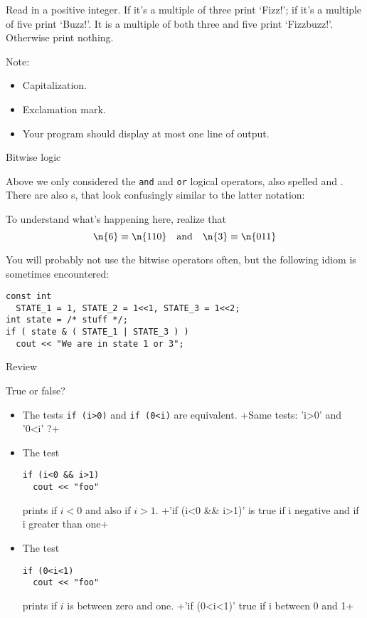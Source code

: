 \begin{exercise}
  \label{ex:fizzbuzz}
  Read in a positive integer. If it's a multiple of three print `Fizz!';
  if it's a multiple of five print `Buzz!'.
  It is a multiple of both three and five print `Fizzbuzz!'.
  Otherwise print nothing.

  Note:
  \begin{itemize}
  \item Capitalization.
  \item Exclamation mark.
  \item Your program should display at most one line of output.
  \end{itemize}
\end{exercise}


 {Bitwise logic}
\label{sec:bitc}

Above we only considered the \lstinline{and} and \lstinline{or} logical operators,
also spelled \n{&&} and \n{||}.
There are also s,
that look confusingly similar to the latter notation:


To understand what's happening here, realize that
\[ \n{6}\equiv \n{110} \quad\hbox{and}\quad \n{3}\equiv\n{011} \]

You will probably not use the bitwise operators often, but
the following idiom is sometimes encountered:
\begin{lstlisting}
const int
  STATE_1 = 1, STATE_2 = 1<<1, STATE_3 = 1<<2;
int state = /* stuff */;
if ( state & ( STATE_1 | STATE_3 ) )
  cout << "We are in state 1 or 3";
\end{lstlisting}

 {Review}

\begin{review}
  \label{q:if}
  True or false?
  \begin{itemize}
  \item The tests \lstinline$if (i>0)$ and \lstinline$if (0<i)$ are equivalent.
    \slackpollTF+Same tests: 'i>0' and '0<i' ?+
  \item The test
\begin{lstlisting}
if (i<0 && i>1) 
  cout << "foo"
\end{lstlisting}
    prints  if
    $i<0$ and also if $i>1$.
    \slackpollTF+'if (i<0 && i>1)' is true if i negative and if i greater than one+
  \item The test 
\begin{lstlisting}
if (0<i<1)
  cout << "foo"
\end{lstlisting}
prints  if $i$ is
    between zero and one.
    \slackpollTF+'if (0<i<1)' true if i between 0 and 1+
  \end{itemize}
\end{review}

